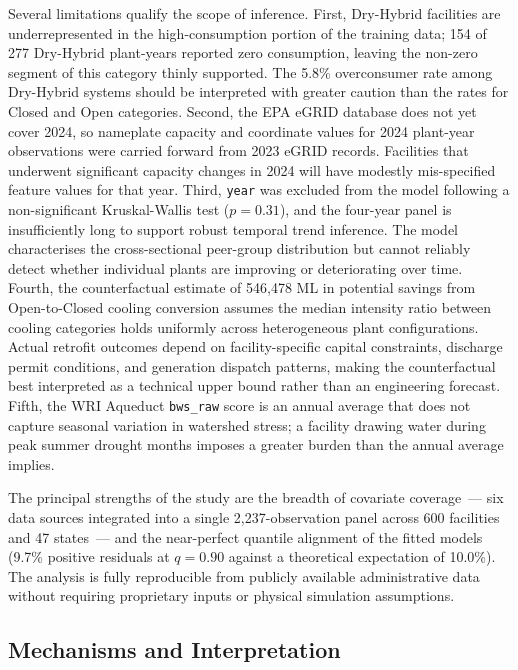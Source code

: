 \documentclass[11pt, letterpaper]{article}
\begin{document}
Several limitations qualify the scope of inference. First, Dry-Hybrid facilities are underrepresented in the high-consumption portion of the training data; 154 of 277 Dry-Hybrid plant-years reported zero consumption, leaving the non-zero segment of this category thinly supported. The 5.8\% overconsumer rate among Dry-Hybrid systems should be interpreted with greater caution than the rates for Closed and Open categories. Second, the EPA eGRID database does not yet cover 2024, so nameplate capacity and coordinate values for 2024 plant-year observations were carried forward from 2023 eGRID records. Facilities that underwent significant capacity changes in 2024 will have modestly mis-specified feature values for that year. Third, \texttt{year} was excluded from the model following a non-significant Kruskal-Wallis test ($p = 0.31$), and the four-year panel is insufficiently long to support robust temporal trend inference. The model characterises the cross-sectional peer-group distribution but cannot reliably detect whether individual plants are improving or deteriorating over time. Fourth, the counterfactual estimate of 546{,}478 ML in potential savings from Open-to-Closed cooling conversion assumes the median intensity ratio between cooling categories holds uniformly across heterogeneous plant configurations. Actual retrofit outcomes depend on facility-specific capital constraints, discharge permit conditions, and generation dispatch patterns, making the counterfactual best interpreted as a technical upper bound rather than an engineering forecast. Fifth, the WRI Aqueduct \texttt{bws\_raw} score is an annual average that does not capture seasonal variation in watershed stress; a facility drawing water during peak summer drought months imposes a greater burden than the annual average implies.

The principal strengths of the study are the breadth of covariate coverage~--- six data sources integrated into a single 2{,}237-observation panel across 600 facilities and 47 states~--- and the near-perfect quantile alignment of the fitted models (9.7\% positive residuals at $q = 0.90$ against a theoretical expectation of 10.0\%). The analysis is fully reproducible from publicly available administrative data without requiring proprietary inputs or physical simulation assumptions.

\subsection{Mechanisms and Interpretation}
\end{document}
